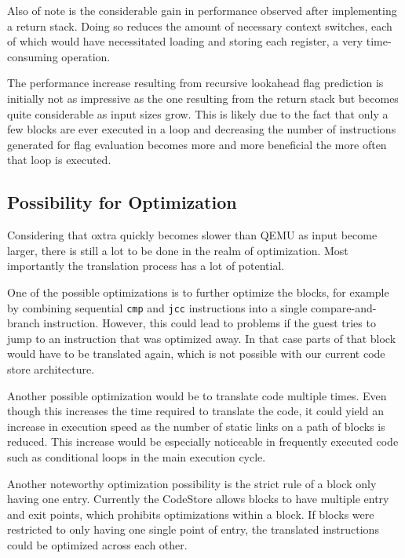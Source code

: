 Also of note is the considerable gain in performance observed after implementing a return stack. Doing so reduces the amount of necessary context switches, each of which would have necessitated loading and storing each register, a very time-consuming operation.

The performance increase resulting from recursive lookahead flag prediction is initially not as impressive as the one resulting from the return stack but becomes quite considerable as input sizes grow. This is likely due to the fact that only a few blocks are ever executed in a loop and decreasing the number of instructions generated for flag evaluation becomes more and more beneficial the more often that loop is executed.

\subsection{Possibility for Optimization}
Considering that oxtra quickly becomes slower than QEMU as input become larger, there is still a lot to be done in the realm of optimization. Most importantly the translation process has a lot of potential.

One of the possible optimizations is to further optimize the blocks, for example by combining sequential \texttt{cmp} and \texttt{jcc} instructions into a single compare-and-branch instruction. However, this could lead to problems if the guest tries to jump to an instruction that was optimized away. In that case parts of that block would have to be translated again, which is not possible with our current code store architecture.

Another possible optimization would be to translate code multiple times. Even though this increases the time required to translate the code, it could yield an increase in execution speed as the number of static links on a path of blocks is reduced. This increase would be especially noticeable in frequently executed code such as conditional loops in the main execution cycle.

Another noteworthy optimization possibility is the strict rule of a block only having one entry. Currently the CodeStore allows blocks to have multiple entry and exit points, which prohibits optimizations within a block. If blocks were restricted to only having one single point of entry, the translated instructions could be optimized across each other. 

